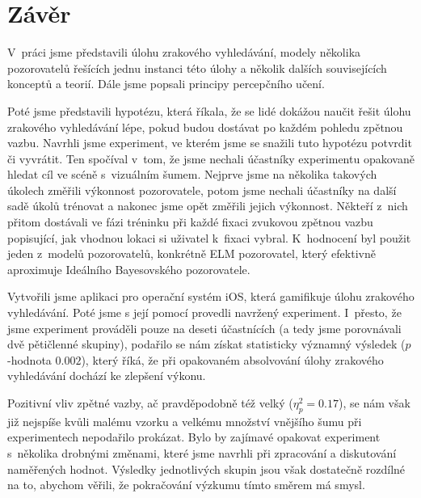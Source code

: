 \chapter*{Závěr}

V~práci jsme představili úlohu zrakového vyhledávání, modely několika pozorovatelů
řešících jednu instanci této úlohy a několik dalších souvisejících konceptů a
teorií. Dále jsme popsali principy percepčního učení.

Poté jsme představili hypotézu, která říkala, že se lidé dokážou naučit řešit
úlohu zrakového vyhledávání lépe, pokud budou dostávat po každém pohledu
zpětnou vazbu. Navrhli jsme experiment, ve kterém jsme se snažili tuto hypotézu
potvrdit či vyvrátit. Ten spočíval v~tom, že jsme nechali účastníky experimentu
opakovaně hledat cíl ve scéně s~vizuálním šumem. Nejprve jsme na několika
takových úkolech změřili výkonnost pozorovatele, potom jsme nechali účastníky
na další sadě úkolů trénovat a nakonec jsme opět změřili jejich výkonnost.
Někteří z~nich přitom dostávali ve fázi tréninku při každé fixaci zvukovou
zpětnou vazbu popisující, jak vhodnou lokaci si uživatel k~fixaci vybral.
K~hodnocení byl použit jeden z~modelů pozorovatelů, konkrétně ELM pozorovatel, který efektivně aproximuje Ideálního Bayesovského pozorovatele.

Vytvořili jsme aplikaci pro operační systém iOS, která gamifikuje úlohu zrakového vyhledávání. Poté jsme s její pomocí provedli navržený experiment. I~přesto, že jsme experiment prováděli pouze na deseti
účastnících (a tedy jsme porovnávali dvě pětičlenné skupiny), podařilo se nám
získat statisticky významný výsledek ($p$-hodnota $0.002$), který říká, že při
opakovaném absolvování úlohy zrakového vyhledávání dochází ke zlepšení výkonu.

Pozitivní vliv zpětné vazby, ač pravděpodobně též velký ($\eta^2_p = 0.17$), se nám však již nejspíše kvůli
malému vzorku a velkému množství vnějšího šumu při experimentech
nepodařilo prokázat. Bylo by zajímavé opakovat experiment s~několika drobnými
změnami, které jsme navrhli při zpracování a diskutování naměřených hodnot.
Výsledky jednotlivých skupin jsou však dostatečně rozdílné na to, abychom věřili, že pokračování
výzkumu tímto směrem má smysl.
